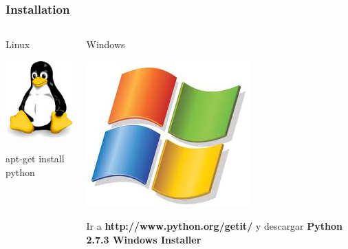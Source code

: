 \documentclass[10pt,colorlinks]{beamer}
\begin{document}
\begin{frame}[fragile]\frametitle{Installation}

  \begin{columns}[T]
    \begin{column}{.4\textwidth}
        \begin{block}{\centering Linux}
\begin{center}
    \includegraphics[scale=0.3]{figs/linux.jpg}
\end{center}
                  apt-get install python
        \end{block}
    \end{column}
    \begin{column}{.6\textwidth}
        \begin{block}{ \centering  Windows}
\centering

\begin{center}
\includegraphics[scale=0.3]{figs/windows.jpg}
\end{center}    
            Ir a \textbf{http://www.python.org/getit/}
            y descargar 
\textbf{Python 2.7.3 Windows Installer}
        \end{block}        
    \end{column}
  \end{columns}
\end{frame}
\end{document}
